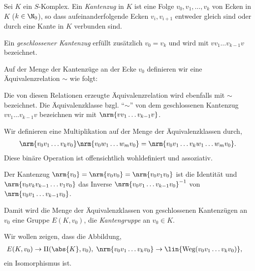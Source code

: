 \begin{defn}
\label{defn:4.2.1}
Sei $K$ ein $S$-Komplex. Ein \emph{Kantenzug} in $K$ ist eine Folge
$v_0,v_1,\ldots,v_k$ von Ecken in $K$ ($k\in\N_0$), so dass aufeinanderfolgende
Ecken $v_i,v_{i+1}$ entweder gleich sind oder durch eine Kante in $K$
verbunden sind.

Ein \emph{geschlossener Kantenzug} erfüllt zusätzlich $v_0 = v_k$ und wird mit
$vv_1\ldots v_{k-1}v$ bezeichnet.

Auf der Menge der Kantenzüge an der Ecke $v_0$ definieren wir eine
Äquivalenzrelation $\sim$ wie folgt:

Die von diesen Relationen erzeugte Äquivalenzrelation wird ebenfalls mit $\sim$
bezeichnet. Die Äquivalenzklasse bzgl. ``$\sim$'' von dem geschlossenen
Kantenzug $vv_1\ldots v_{k-1}v$ bezeichnen wir mit $\nrm{vv_1\ldots v_{k-1}v}$.

Wir definieren eine Multiplikation auf der Menge der Äquivalenzklassen durch,
\begin{align*}
\nrm{v_0v_1\ldots v_kv_0}\nrm{v_0w_1\ldots w_mv_0} = \nrm{v_0v_1\ldots
v_kw_1\ldots w_m v_0}.
\end{align*}
Diese binäre Operation ist offensichtlich wohldefiniert und assoziativ.

Der Kantenzug $\nrm{v_0}=\nrm{v_0v_0}=\nrm{v_0v_1v_0}$ ist die Identität und
$\nrm{v_0 v_k v_{k-1} \ldots v_1 v_0}$ das Inverse $\nrm{v_0 v_1 \ldots v_{k-1}
v_0}^{-1}$ von $\nrm{v_0 v_1 \ldots v_{k-1} v_0}$.

Damit wird die Menge der Äquivalenzklassen von geschlossenen Kantenzügen an
$v_0$ eine Gruppe $E(K,v_0)$, die \emph{Kantengruppe} an $v_0\in K$.\fishhere
\end{defn}

Wir wollen zeigen, dass die Abbildung,
\begin{align*}
&E(K,v_0)\to\Pi(\abs{K},v_0),\; \nrm{v_0v_1\ldots v_{k}v_0}\to \lin{\text{Weg}
(v_0v_1\ldots v_kv_0)},
\end{align*}
ein Isomorphismus ist. 

